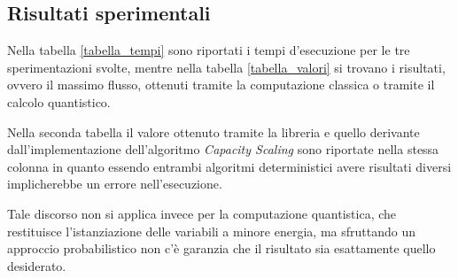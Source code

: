 \documentclass{article}
\begin{document}
\subsection{Risultati sperimentali}
Nella tabella \ref{tabella_tempi} sono riportati i tempi d'esecuzione per le tre sperimentazioni svolte, mentre nella tabella \ref{tabella_valori} si trovano i risultati, ovvero il massimo flusso, ottenuti tramite la computazione classica o tramite il calcolo quantistico.

Nella seconda tabella il valore ottenuto tramite la libreria e quello derivante dall'implementazione dell'algoritmo \emph{Capacity Scaling} sono riportate nella stessa colonna in quanto essendo entrambi algoritmi deterministici avere risultati diversi implicherebbe un errore nell'esecuzione.

Tale discorso non si applica invece per la computazione quantistica, che restituisce l'istanziazione delle variabili a minore energia, ma sfruttando un approccio probabilistico non c'è garanzia che il risultato sia esattamente quello desiderato.
\end{document}
